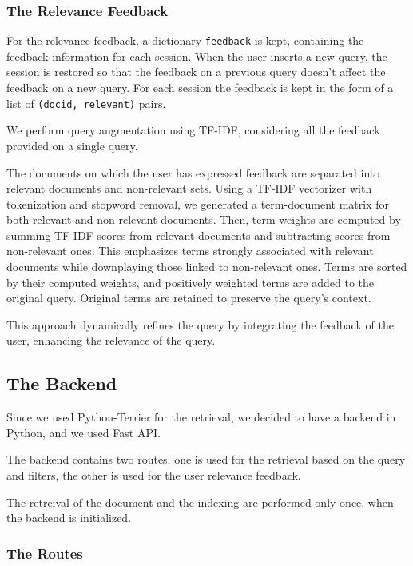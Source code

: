 \documentclass[unicode,9pt,a4paper,oneside,numbers=endperiod,openany]{scrartcl}
\begin{document}
\subsubsection{The Relevance Feedback}

For the relevance feedback, a dictionary \texttt{feedback} is kept, containing the feedback information for each session. When the user inserts a new query, the session is restored so that the feedback on a previous query doesn't affect the feedback on a new query.
For each session the feedback is kept in the form of a list of  \texttt{(docid, relevant)} pairs.

We perform query augmentation using TF-IDF, considering all the feedback provided on a single query.

The documents on which the user has expressed feedback are separated into relevant documents and non-relevant sets. Using a TF-IDF vectorizer with tokenization and stopword removal, we generated a term-document matrix for both relevant and non-relevant documents.
Then, term weights are computed by summing TF-IDF scores from relevant documents and subtracting scores from non-relevant ones. This emphasizes terms strongly associated with relevant documents while downplaying those linked to non-relevant ones.
Terms are sorted by their computed weights, and positively weighted terms are added to the original query. Original terms are retained to preserve the query's context.

This approach dynamically refines the query by integrating the feedback of the user, enhancing the relevance of the query.



\subsection{The Backend}

Since we used Python-Terrier for the retrieval, we decided to have a backend in Python, and we used Fast API.

The backend contains two routes, one is used for the retrieval based on the query and filters, the other is used for the user relevance feedback.

The retreival of the document and the indexing are performed only once, when the backend is initialized.

\subsubsection{The Routes}
\end{document}
